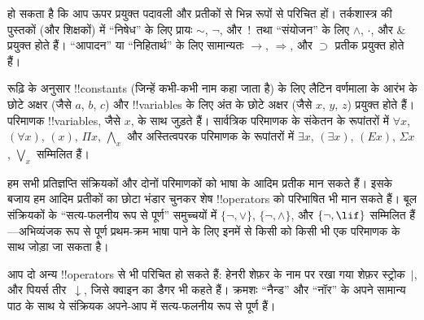 \documentclass[../../../include/open-logic-section]{subfiles}
\begin{document}

\begin{intro}
हो सकता है कि आप ऊपर प्रयुक्त पदावली और प्रतीकों से भिन्न रूपों से परिचित
हों। तर्कशास्त्र की पुस्तकों (और शिक्षकों) में ``निषेध'' के लिए प्रायः
$\sim$, $\neg$, और~!\ तथा ``संयोजन'' के लिए $\wedge$, $\cdot$, और $\&$
प्रयुक्त होते हैं। ``आपादन'' या ``निहितार्थ'' के लिए सामान्यतः
$\rightarrow$, $\Rightarrow$, और $\supset$ प्रतीक प्रयुक्त होते हैं।

रूढ़ि के अनुसार !!{constant}s (जिन्हें कभी-कभी नाम कहा जाता है) के लिए
लैटिन वर्णमाला के आरंभ के छोटे अक्षर (जैसे $a$, $b$, $c$) और !!{variable}s
के लिए अंत के छोटे अक्षर (जैसे $x$, $y$, $z$) प्रयुक्त होते हैं। परिमाणक
!!{variable}s, जैसे $x$, के साथ जुड़ते हैं। सार्वत्रिक परिमाणक के संकेतन के
रूपांतरों में $\forall x$, $(\forall x)$, $(x)$, $\Pi x$, $\bigwedge_x$ और
अस्तित्वपरक परिमाणक के रूपांतरों में $\exists x$, $(\exists
x)$, $(Ex)$,
$\Sigma x$, $\bigvee_x$ सम्मिलित हैं।
\end{intro}

\begin{explain}
हम सभी प्रतिज्ञप्ति संक्रियकों और दोनों परिमाणकों को भाषा के आदिम प्रतीक मान
सकते हैं। इसके बजाय हम आदिम प्रतीकों का छोटा भंडार चुनकर शेष !!{operator}s
को परिभाषित भी मान सकते हैं। बूल संक्रियकों के ``सत्य-फलनीय रूप से पूर्ण''
समुच्चयों में $\{ \lnot, \lor \}$, $\{ \lnot, \land \}$, और $\{ \lnot,
\lif\}$ सम्मिलित हैं---अभिव्यंजक रूप से पूर्ण प्रथम-क्रम भाषा पाने के लिए
इनमें से किसी को किसी भी एक परिमाणक के साथ जोड़ा जा सकता है।

आप दो अन्य !!{operator}s से भी परिचित हो सकते हैं: हेनरी शेफ़र के नाम पर
रखा गया शेफ़र स्ट्रोक~$|$, और पियर्स तीर~$\downarrow$, जिसे क्वाइन का डैगर
भी कहते हैं। क्रमशः ``नैन्ड'' और ``नॉर'' के अपने सामान्य पाठ के साथ ये
संक्रियक अपने-आप में सत्य-फलनीय रूप से पूर्ण हैं।
\end{explain}
\end{document}
